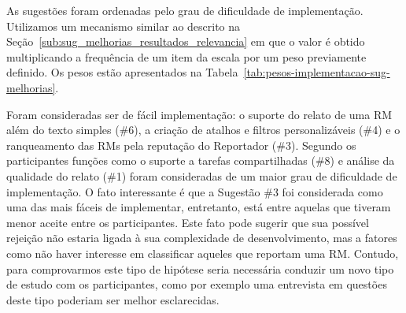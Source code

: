 As sugestões foram ordenadas pelo grau de dificuldade de implementação.
Utilizamos um mecanismo similar ao descrito na
Seção~\ref{sub:sug_melhorias_resultados_relevancia} em que o valor é obtido
multiplicando a frequência de um item da escala por um peso previamente
definido. Os pesos estão apresentados na
Tabela~\ref{tab:pesos-implementacao-sug-melhorias}.

\begin{table}[htpb]
\centering
{}
\caption{Pesos utilizados no ranqueamento das sugestões de melhorias}
\label{tab:pesos-implementacao-sug-melhorias}
\end{table}

Foram consideradas ser de fácil implementação: o suporte do relato de uma RM
além do texto simples (\#6), a criação de atalhos e filtros personalizáveis
(\#4) e o ranqueamento das RMs pela reputação do Reportador (\#3). Segundo os
participantes funções como o suporte a tarefas compartilhadas (\#8) e análise
da qualidade do relato (\#1) foram consideradas de um maior grau de dificuldade
de implementação. O fato interessante é que a Sugestão \#3 foi considerada como
uma das mais fáceis de implementar, entretanto, está entre aquelas que tiveram
menor aceite entre os participantes. Este fato pode sugerir que sua possível
rejeição não estaria ligada à sua complexidade de desenvolvimento, mas a
fatores como não haver interesse em classificar aqueles que reportam uma RM\@.
Contudo, para comprovarmos este tipo de hipótese seria necessária conduzir um
novo tipo de estudo com os participantes, como por exemplo uma entrevista em
questões deste tipo poderiam ser melhor esclarecidas.


